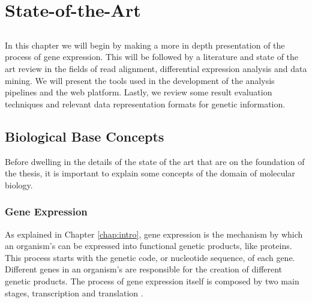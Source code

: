 \chapter{State-of-the-Art} \label{chap:sota}

\section*{}


In this chapter we will begin by making a more in depth presentation of the
process of gene expression. This will be followed by a literature and state of
the art review in the fields of read alignment, differential expression analysis
and data mining. We will present the tools used in the development of the
analysis pipelines and the web platform. Lastly, we review some result
evaluation techniques and relevant data representation formats for genetic
information.

\section{Biological Base Concepts}


Before dwelling in the details of the state of the art that are on the
foundation of the thesis, it is important to explain some concepts of the
domain of molecular biology.

\subsection{Gene Expression}

As explained in Chapter \ref{chap:intro}, gene expression is the mechanism by
which an organism's \dna{} can be expressed into functional genetic products,
like proteins. This process starts with the genetic code, or nucleotide
sequence, of each gene. Different genes in an organism's \dna{} are responsible
for the creation of different genetic products. The process of gene expression
itself is composed by two main stages, transcription and translation
\cite{leic:gene_expr}.

